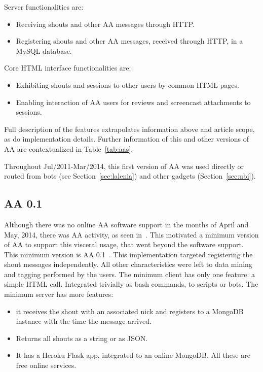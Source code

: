 \documentclass[12pt,fleqn]{article}
\begin{document}
Server functionalities are:
\begin{itemize}
    \item Receiving shouts and other AA messages through HTTP.
    \item Registering shouts and other AA messages, received through HTTP, in a MySQL database.
\end{itemize}

Core HTML interface functionalities are:
\begin{itemize}
    \item Exhibiting shouts and sessions to other users by common HTML pages.
    \item Enabling interaction of AA users for reviews and screencast attachments to sessions.
\end{itemize}

Full description of the features extrapolates information above and article scope,
as do implementation details.
Further information of this and other versions of AA are contextualized in Table~\ref{tab:aas}.

Throughout Jul/2011-Mar/2014, this first version of AA 
was used directly or routed from bots (see Section~\ref{sec:lalenia})
and other gadgets (Section~\ref{sec:ubi}).

\subsection{AA 0.1}\label{sec:aa01}
Although there was no online AA software support in the months of April and May, 2014,
there was AA activity, as seen in~\cite{ensaaio}.
This motivated a minimum version of AA to support this visceral usage,
that went beyond the software support.
This minimum version is AA 0.1~\citep{aa01r}.
This implementation targeted registering the shout messages independently.
All other characteristics were left to data mining and tagging performed by the users.
The minimum client has only one feature:
a simple HTML call. Integrated trivially as bash commands, to scripts or bots.
The minimum server has more features:
\begin{itemize}
    \item it receives the shout with an associated nick and registers to a MongoDB instance with the time the message arrived.
    \item Returns all shouts as a string or as JSON.
    \item It has a Heroku Flask app, integrated to an online MongoDB.
	    All these are free online services. 
\end{itemize}
\end{document}
